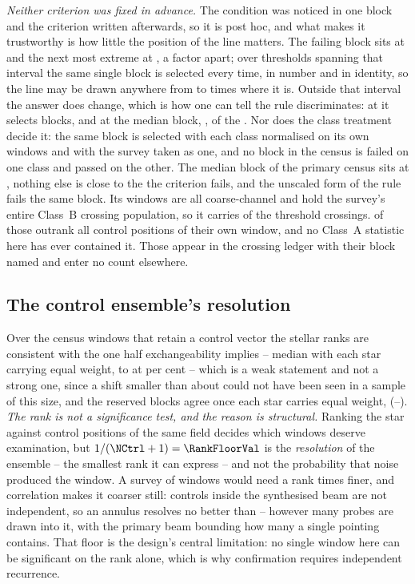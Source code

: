 \emph{Neither criterion was fixed in advance.} The condition was noticed
in one block and the criterion written afterwards, so it is post hoc, and
what makes it trustworthy is how little the position of the line matters. The
failing block sits at \BqFailQ{} and the next most extreme at \BqNextQ, a
factor \QsRatio{} apart; over \QsNStep{} thresholds spanning that interval
the same single block is selected every time, in number and in identity, so
the line may be drawn anywhere from \QsMarginLo{} to \QsMarginHi{} times
where it is. Outside that interval the answer does change, which is how one
can tell the rule discriminates: at \BqNextQ{} it selects \QsNAtNext{}
blocks, and at the median block, \QsQMed, \QsNAtMed{} of the
\BqNBlocks. Nor does the class treatment decide it: the same block is
selected with each class normalised on its own windows and with the survey
taken as one, and no block in the census is failed on one class
and passed on the other. The median block of the primary census sits at
\BqQMed, nothing else is close to the \BqNFail{} the criterion fails, and the
unscaled form of the rule fails the same \BqRawNFail{} block. Its
\BqFailNWin{} windows are all coarse-channel and
hold the survey's entire Class~B crossing population, so it carries
\EvNCrossFlag{} of the \EvNCrossRaw{} threshold crossings. \EvNRankFlag{}
of those outrank all \NCtrl{} control positions of their own window, and
no Class~A statistic here has ever contained it. Those \EvNCrossFlag{} appear
in the crossing ledger with their block named and enter no count
elsewhere.

\subsection{The control ensemble's resolution}

Over the \VerNTested{} census windows that retain a control vector the
stellar ranks are consistent with the one half exchangeability implies --
median \BkRankBalSurv{} with each star carrying equal weight,
\BkRankBalSurvLo{} to \BkRankBalSurvHi{} at \CeCovPct{} per cent -- which is
a weak statement and not a strong one, since a shift smaller than about
\VerKsPowerAca{} could not have been seen in a sample of this size, and the
reserved blocks agree once each star carries equal weight, \BkRankBalHo{}
(\BkRankBalHoLo--\BkRankBalHoHi). \emph{The rank is not a significance test,
and the reason is structural.}
Ranking the star against \NCtrl{} control positions of the same field
decides which windows deserve examination, but $1/(\NCtrl+1)=\RankFloorVal$
is the \emph{resolution} of the ensemble -- the smallest rank it can
express -- and not the probability that noise produced the window. A survey
of \NWindows{} windows would need a rank \BonfRankRatio{} times finer, and
correlation makes it coarser still: controls inside the synthesised beam are
not independent, so an annulus resolves no better than
\RankEffLo--\RankEffHi{} however many probes are drawn into it, with the
primary beam bounding how many a single pointing contains. That floor is the
design's central limitation: no single window here can be significant on the
rank alone, which is why confirmation requires independent recurrence.

